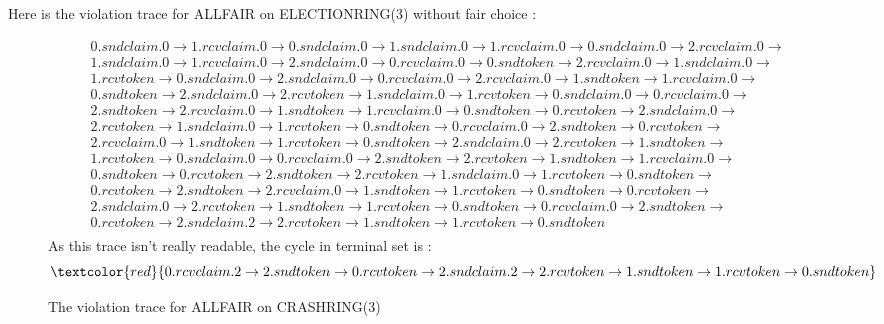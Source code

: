Here is the violation trace for ALLFAIR on ELECTIONRING(3) without fair choice :
\begin{figure}[!h]
\begin{equation*}
\begin{aligned}
    0.sndclaim.0 \rightarrow 1.rcvclaim.0 \rightarrow 0.sndclaim.0 \rightarrow 1.sndclaim.0 \rightarrow 1.rcvclaim.0 \rightarrow 0.sndclaim.0 \rightarrow 2.rcvclaim.0 \rightarrow \\
    1.sndclaim.0 \rightarrow 1.rcvclaim.0 \rightarrow 2.sndclaim.0 \rightarrow 0.rcvclaim.0 \rightarrow 0.sndtoken \rightarrow 2.rcvclaim.0 \rightarrow 1.sndclaim.0 \rightarrow \\
    1.rcvtoken \rightarrow 0.sndclaim.0 \rightarrow 2.sndclaim.0 \rightarrow 0.rcvclaim.0 \rightarrow 2.rcvclaim.0 \rightarrow 1.sndtoken \rightarrow 1.rcvclaim.0 \rightarrow \\
    0.sndtoken \rightarrow 2.sndclaim.0 \rightarrow 2.rcvtoken \rightarrow 1.sndclaim.0 \rightarrow 1.rcvtoken \rightarrow 0.sndclaim.0 \rightarrow 0.rcvclaim.0 \rightarrow \\
    2.sndtoken \rightarrow 2.rcvclaim.0 \rightarrow 1.sndtoken \rightarrow 1.rcvclaim.0 \rightarrow 0.sndtoken \rightarrow 0.rcvtoken \rightarrow 2.sndclaim.0 \rightarrow  \\
    2.rcvtoken \rightarrow 1.sndclaim.0 \rightarrow 1.rcvtoken \rightarrow 0.sndtoken \rightarrow 0.rcvclaim.0 \rightarrow 2.sndtoken \rightarrow 0.rcvtoken \rightarrow    \\
    2.rcvclaim.0 \rightarrow 1.sndtoken \rightarrow 1.rcvtoken \rightarrow 0.sndtoken \rightarrow 2.sndclaim.0 \rightarrow 2.rcvtoken \rightarrow 1.sndtoken \rightarrow   \\
    1.rcvtoken \rightarrow 0.sndclaim.0 \rightarrow 0.rcvclaim.0 \rightarrow 2.sndtoken \rightarrow 2.rcvtoken \rightarrow 1.sndtoken \rightarrow 1.rcvclaim.0 \rightarrow  \\
    0.sndtoken \rightarrow 0.rcvtoken \rightarrow 2.sndtoken \rightarrow 2.rcvtoken \rightarrow 1.sndclaim.0 \rightarrow 1.rcvtoken \rightarrow 0.sndtoken \rightarrow     \\
    0.rcvtoken \rightarrow 2.sndtoken \rightarrow 2.rcvclaim.0 \rightarrow 1.sndtoken \rightarrow 1.rcvtoken \rightarrow 0.sndtoken \rightarrow 0.rcvtoken \rightarrow \\
    2.sndclaim.0 \rightarrow 2.rcvtoken \rightarrow 1.sndtoken \rightarrow 1.rcvtoken \rightarrow 0.sndtoken \rightarrow 0.rcvclaim.0 \rightarrow 2.sndtoken \rightarrow \\
    0.rcvtoken \rightarrow 2.sndclaim.2 \rightarrow 2.rcvtoken \rightarrow 1.sndtoken \rightarrow 1.rcvtoken \rightarrow 0.sndtoken \\
\end{aligned}
\end{equation*}
As this trace isn't really readable, the cycle in terminal set is :
\begin{equation*}
    \textcolor{red}{0.rcvclaim.2 \rightarrow 2.sndtoken \rightarrow 0.rcvtoken \rightarrow 2.sndclaim.2 \rightarrow 2.rcvtoken \rightarrow 1.sndtoken \rightarrow 1.rcvtoken \rightarrow 0.sndtoken}
\end{equation*}
\caption{The violation trace for ALLFAIR on CRASHRING(3)}
\end{figure}
